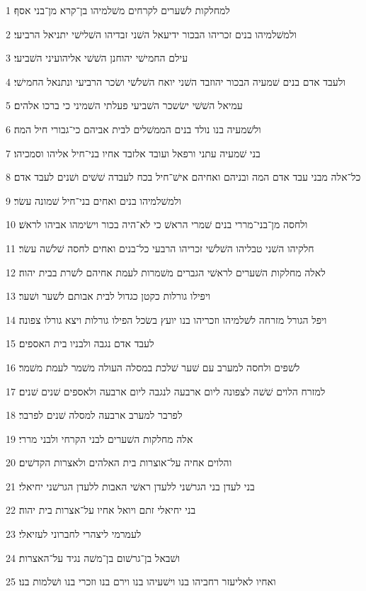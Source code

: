 \par 1 למחלקות לשׁערים לקרחים משׁלמיהו בן־קרא מן־בני אסף׃
\par 2 ולמשׁלמיהו בנים זכריהו הבכור ידיעאל השׁני זבדיהו השׁלישׁי יתניאל הרביעי׃
\par 3 עילם החמישׁי יהוחנן השׁשׁי אליהועיני השׁביעי׃
\par 4 ולעבד אדם בנים שׁמעיה הבכור יהוזבד השׁני יואח השׁלשׁי ושׂכר הרביעי ונתנאל החמישׁי׃
\par 5 עמיאל השׁשׁי ישׂשכר השׁביעי פעלתי השׁמיני כי ברכו אלהים׃
\par 6 ולשׁמעיה בנו נולד בנים הממשׁלים לבית אביהם כי־גבורי חיל המה׃
\par 7 בני שׁמעיה עתני ורפאל ועובד אלזבד אחיו בני־חיל אליהו וסמכיהו׃
\par 8 כל־אלה מבני עבד אדם המה ובניהם ואחיהם אישׁ־חיל בכח לעבדה שׁשׁים ושׁנים לעבד אדם׃
\par 9 ולמשׁלמיהו בנים ואחים בני־חיל שׁמונה עשׂר׃
\par 10 ולחסה מן־בני־מררי בנים שׁמרי הראשׁ כי לא־היה בכור וישׂימהו אביהו לראשׁ׃
\par 11 חלקיהו השׁני טבליהו השׁלשׁי זכריהו הרבעי כל־בנים ואחים לחסה שׁלשׁה עשׂר׃
\par 12 לאלה מחלקות השׁערים לראשׁי הגברים משׁמרות לעמת אחיהם לשׁרת בבית יהוה׃
\par 13 ויפילו גורלות כקטן כגדול לבית אבותם לשׁער ושׁער׃
\par 14 ויפל הגורל מזרחה לשׁלמיהו וזכריהו בנו יועץ בשׂכל הפילו גורלות ויצא גורלו צפונה׃
\par 15 לעבד אדם נגבה ולבניו בית האספים׃
\par 16 לשׁפים ולחסה למערב עם שׁער שׁלכת במסלה העולה משׁמר לעמת משׁמר׃
\par 17 למזרח הלוים שׁשׁה לצפונה ליום ארבעה לנגבה ליום ארבעה ולאספים שׁנים שׁנים׃
\par 18 לפרבר למערב ארבעה למסלה שׁנים לפרבר׃
\par 19 אלה מחלקות השׁערים לבני הקרחי ולבני מררי׃
\par 20 והלוים אחיה על־אוצרות בית האלהים ולאצרות הקדשׁים׃
\par 21 בני לעדן בני הגרשׁני ללעדן ראשׁי האבות ללעדן הגרשׁני יחיאלי׃
\par 22 בני יחיאלי זתם ויואל אחיו על־אצרות בית יהוה׃
\par 23 לעמרמי ליצהרי לחברוני לעזיאלי׃
\par 24 ושׁבאל בן־גרשׁום בן־משׁה נגיד על־האצרות׃
\par 25 ואחיו לאליעזר רחביהו בנו וישׁעיהו בנו וירם בנו וזכרי בנו ושׁלמות בנו׃
